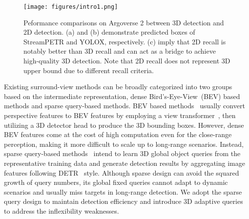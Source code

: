 \documentclass[letterpaper]{article} \usepackage{aaai24}
\begin{document}
\begin{figure}[t!]
    \centering  
    \texttt{[image: figures/intro1.png]}
    \caption{Peformance comparisons on Argoverse 2 between 3D detection and 2D detection. (a) and (b) demonstrate predicted boxes of StreamPETR and YOLOX, respectively. (c) imply that 2D recall is notably better than 3D recall and can act as a bridge to achieve high-quality 3D detection. Note that 2D recall does not represent 3D upper bound due to different recall criteria.}
    \label{fig:intro}
\vspace{-0.5cm}
\end{figure}

Existing surround-view methods can be broadly categorized into two groups based on the intermediate representation, dense Bird's-Eye-View~(BEV) based methods and sparse query-based methods. BEV based methods~\cite{huang2021bevdet, huang2022bevdet4d, li2023bevdepth,li2022bevformer, yang2023bevformer} usually convert perspective features to BEV features by employing a view transformer~\cite{philion2020lift}, then utilizing a 3D detector head to produce the 3D bounding boxes. However, dense BEV features come at the cost of high computation even for the close-range perception, making it more difficult to scale up to long-range scenarios.
Instead, sparse query-based methods~\cite{wang2022detr3d, liu2022petr, liu2022petrv2, wang2023exploring} intend to learn 3D global object queries from the representative training data and generate detection results by aggregating image features following DETR~\cite{carion2020end} style. Although sparse design can avoid the squared growth of query numbers, its global fixed queries cannot adapt to dynamic scenarios and usually miss targets in long-range detection.
We adopt the sparse query design to maintain detection efficiency and introduce 3D adaptive queries to address the inflexibility weaknesses.
\end{document}
